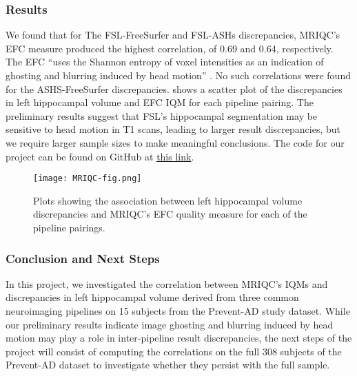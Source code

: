 \documentclass[../main.tex]{subfiles}
\begin{document}
\subsubsection{Results}

We found that for The FSL-FreeSurfer and FSL-ASHs discrepancies, MRIQC’s EFC measure produced the highest correlation, of 0.69 and 0.64, respectively. The EFC “uses the Shannon entropy of voxel intensities as an indication of ghosting and blurring induced by head motion” \parencite{MRIQCdoc}. No such correlations were found for the ASHS-FreeSurfer discrepancies.  shows a scatter plot of the discrepancies in left hippocampal volume and EFC IQM for each pipeline pairing. The preliminary results suggest that FSL’s hippocampal segmentation may be sensitive to head motion in T1 scans, leading to larger result discrepancies, but we require larger sample sizes to make meaningful conclusions. The code for our project can be found on GitHub at \href{https://github.com/jacobsanz97/Pipeline-Discrepancy-Exploration}{this link}. 

\begin{figure}
	\centering
	\texttt{[image: MRIQC-fig.png]}
	\caption{Plots showing the association between left hippocampal volume discrepancies and MRIQC’s EFC quality measure for each of the pipeline pairings.}
	\label{fig:MRIQC-fig}
\end{figure}

\subsubsection{Conclusion and Next Steps}

In this project, we investigated the correlation between MRIQC’s IQMs and discrepancies in left hippocampal volume derived from three common neuroimaging pipelines on 15 subjects from the Prevent-AD study dataset. While our preliminary results indicate image ghosting and blurring induced by head motion may play a role in inter-pipeline result discrepancies, the next steps of the project will consist of computing the correlations on the full 308 subjects of the Prevent-AD dataset to investigate whether they persist with the full sample.
\end{document}
